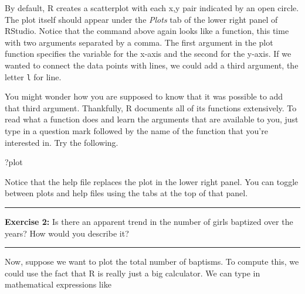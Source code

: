 \documentclass[]{book}
\newenvironment{Shaded}{\begin{snugshade}}{\end{snugshade}}
\newcommand{\DataTypeTok}[1]{\textcolor[rgb]{0.13,0.29,0.53}{#1}}
\newcommand{\KeywordTok}[1]{\textcolor[rgb]{0.13,0.29,0.53}{\textbf{#1}}}
\newcommand{\NormalTok}[1]{#1}
\newcommand{\OperatorTok}[1]{\textcolor[rgb]{0.81,0.36,0.00}{\textbf{#1}}}
\newcommand{\StringTok}[1]{\textcolor[rgb]{0.31,0.60,0.02}{#1}}
\theoremstyle{definition}
\theoremstyle{definition}
\theoremstyle{definition}
\theoremstyle{remark}
\begin{document}
By default, R creates a scatterplot with each x,y pair indicated by an
open circle. The plot itself should appear under the \emph{Plots} tab of
the lower right panel of RStudio. Notice that the command above again
looks like a function, this time with two arguments separated by a
comma. The first argument in the plot function specifies the variable
for the x-axis and the second for the y-axis. If we wanted to connect
the data points with lines, we could add a third argument, the letter
\texttt{l} for line.

\begin{Shaded}
\end{Shaded}

You might wonder how you are supposed to know that it was possible to
add that third argument. Thankfully, R documents all of its functions
extensively. To read what a function does and learn the arguments that
are available to you, just type in a question mark followed by the name
of the function that you're interested in. Try the following.

\begin{Shaded}
\begin{Highlighting}[]
\NormalTok{?plot}
\end{Highlighting}
\end{Shaded}

Notice that the help file replaces the plot in the lower right panel.
You can toggle between plots and help files using the tabs at the top of
that panel.

\begin{center}\rule{0.5\linewidth}{\linethickness}\end{center}

\textbf{Exercise 2:} Is there an apparent trend in the number of girls
baptized over the years? How would you describe it?

\begin{center}\rule{0.5\linewidth}{\linethickness}\end{center}

Now, suppose we want to plot the total number of baptisms. To compute
this, we could use the fact that R is really just a big calculator. We
can type in mathematical expressions like
\end{document}
